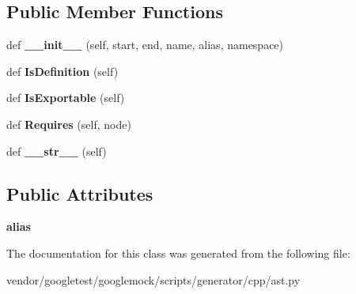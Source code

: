 \subsection*{Public Member Functions}
\begin{DoxyCompactItemize}
\item 
\mbox{\label{classcpp_1_1ast_1_1_typedef_af3275d2390190a074de470c1424e05e0}} 
def {\bfseries \+\_\+\+\_\+init\+\_\+\+\_\+} (self, start, end, name, alias, namespace)
\item 
\mbox{\label{classcpp_1_1ast_1_1_typedef_a103bf391e665884bfbfd20fc5e6d1a19}} 
def {\bfseries Is\+Definition} (self)
\item 
\mbox{\label{classcpp_1_1ast_1_1_typedef_adee58e4674b049d8e4435b5b6ad8e1d4}} 
def {\bfseries Is\+Exportable} (self)
\item 
\mbox{\label{classcpp_1_1ast_1_1_typedef_aa9f65f4a97ba340f2c9ebc5e7ce27e8c}} 
def {\bfseries Requires} (self, node)
\item 
\mbox{\label{classcpp_1_1ast_1_1_typedef_a451920900affc5f12e38ab8fbf5e3dea}} 
def {\bfseries \+\_\+\+\_\+str\+\_\+\+\_\+} (self)
\end{DoxyCompactItemize}
\subsection*{Public Attributes}
\begin{DoxyCompactItemize}
\item 
\mbox{\label{classcpp_1_1ast_1_1_typedef_a3187a504dfbefe50b866b44902823c30}} 
{\bfseries alias}
\end{DoxyCompactItemize}


The documentation for this class was generated from the following file\+:\begin{DoxyCompactItemize}
\item 
vendor/googletest/googlemock/scripts/generator/cpp/ast.\+py\end{DoxyCompactItemize}
